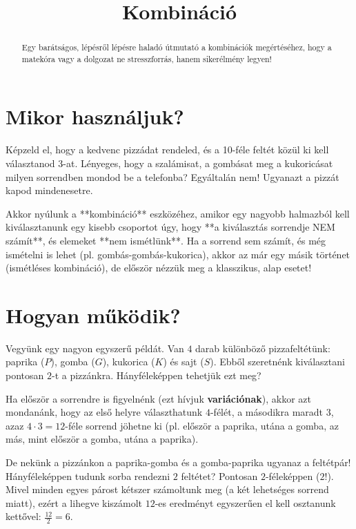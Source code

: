 \documentclass[11pt,a4paper]{article}
\title{Kombináció}
\author{}
\date{}
\begin{document}
\maketitle

\begin{abstract}
\noindent Egy barátságos, lépésről lépésre haladó útmutató a kombinációk megértéséhez, hogy a matekóra vagy a dolgozat ne stresszforrás, hanem sikerélmény legyen!
\end{abstract}

\section{Mikor használjuk?}
Képzeld el, hogy a kedvenc pizzádat rendeled, és a 10-féle feltét közül ki kell választanod 3-at. Lényeges, hogy a szalámisat, a gombásat meg a kukoricásat milyen sorrendben mondod be a telefonba? Egyáltalán nem! Ugyanazt a pizzát kapod mindenesetre. 

Akkor nyúlunk a **kombináció** eszközéhez, amikor egy nagyobb halmazból kell kiválasztanunk egy kisebb csoportot úgy, hogy **a kiválasztás sorrendje NEM számít**, és elemeket **nem ismétlünk**. Ha a sorrend sem számít, és még ismételni is lehet (pl. gombás-gombás-kukorica), akkor az már egy másik történet (ismétléses kombináció), de először nézzük meg a klasszikus, alap esetet!

\section{Hogyan működik?}
Vegyünk egy nagyon egyszerű példát. Van $4$ darab különböző pizzafeltétünk: paprika ($P$), gomba ($G$), kukorica ($K$) és sajt ($S$). Ebből szeretnénk kiválasztani pontosan $2$-t a pizzánkra. Hányféleképpen tehetjük ezt meg?

Ha először a sorrendre is figyelnénk (ezt hívjuk \textbf{variációnak}), akkor azt mondanánk, hogy az első helyre választhatunk $4$-félét, a másodikra maradt $3$, azaz $4 \cdot 3 = 12$-féle sorrend jöhetne ki (pl. először a paprika, utána a gomba, az más, mint először a gomba, utána a paprika). 

De nekünk a pizzánkon a paprika-gomba és a gomba-paprika ugyanaz a feltétpár! Hányféleképpen tudunk sorba rendezni $2$ feltétet? Pontosan $2$-féleképpen ($2!$). Mivel minden egyes párost kétszer számoltunk meg (a két lehetséges sorrend miatt), ezért a lihegve kiszámolt $12$-es eredményt egyszerűen el kell osztanunk kettővel: $\frac{12}{2} = 6$.
\end{document}
